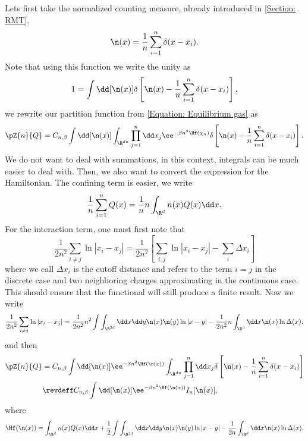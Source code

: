 Lets first take the normalized counting measure, already introduced in \autoref{Section: RMT},
\begin{equation}
	\n(x) = \frac{1}{n} \sum_{i = 1}^{n} \delta(x - x_i).
\end{equation}
Note that using this function we write the unity as
\begin{equation}
	1 = \int \dd [\n(x)] \delta \left[ \n(x) - \frac{1}{n} \sum_{i=1}^{n} \delta(x - x_i) \right],
\end{equation}
we rewrite our partition function from \eqref{Equation: Equilibrium gas} as
\begin{equation}
	\pZ{n}{Q} = C_{n, \beta} \int \dd [\n(x)] \int_{\R^{dn}} \prod_{j=1}^{n} \dd x_j \ee^{-\beta n^2 \Hf(\chi_n)} \delta  \left[ \n(x) - \frac{1}{n} \sum_{i=1}^{n} \delta(x - x_i) \right].
\end{equation}
We do not want to deal with summations, in this context, integrals can be much easier to deal with. Then, we also want to convert the expression for the Hamiltonian. The confining term is easier, we write
\begin{equation}
	\frac{1}{n} \sum_{i=1}^{n} Q(x) = \frac{1}{n} n \int_{\R^d} n(x) Q(x) \dd x.
\end{equation}
For the interaction term, one must first note that
\begin{equation}
	\frac{1}{2n^2} \sum_{i \neq j} \ln |x_i - x_j| = \frac{1}{2n^2} \left[ \sum_{i,j} \ln |x_i - x_j| - \sum_i \Delta x_i \right]
\end{equation}
where we call $\Delta x_i$ is the cutoff distance and refers to the term $i = j$ in the discrete case and two neighboring charges approximating in the continuous case. This should ensure that the functional will still produce a finite result. Now we write
\begin{equation}
		\frac{1}{2n^2} \sum_{i \neq j} \ln |x_i - x_j| = \frac{1}{2n^2} n^2 \int \int_{\R^{2d}} \dd x \dd y \n(x) \n(y) \ln |x - y| - 	\frac{1}{2n^2} n \int_{\R^d} \dd x \n(x) \ln \Delta (x). 
\end{equation}
and then
\begin{align}
		\pZ{n}{Q}&  = C_{n, \beta} \int \dd [\n(x)] \ee^{-\beta n^2 \Hf(\n(x))} \int_{\R^{dn}} \prod_{j=1}^{n} \dd x_j \delta \left[ \n(x) - \frac{1}{n} \sum_{i=1}^{n} \delta(x - x_i) \right] \\
		& \revdeff  C_{n, \beta} \int \dd [\n(x)] \ee^{-\beta n^2 \Hf(\n(x))} I_n[\n(x)],
\end{align}
where
\begin{equation}
	\Hf(\n(x)) = \int_{\R^d} n(x) Q(x) \dd x + \frac{1}{2} \int \int_{\R^{2d}} \dd x \dd y \n(x) \n(y) \ln |x - y| - \frac{1}{2n} \int_{\R^d} \dd x \n(x) \ln \Delta (x). 
\end{equation}

